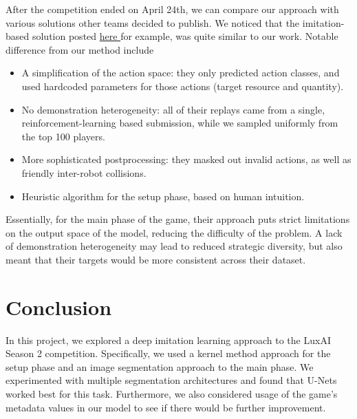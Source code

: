 \documentclass[10pt,twocolumn,letterpaper]{article}
\begin{document}
After the competition ended on April 24th, we can compare our
approach with various solutions other teams decided to publish.
We noticed that the imitation-based solution posted
\href{https://www.kaggle.com/competitions/lux-ai-season-2/discussion/404842}{%
  here%
} for example, was quite similar to our work.
Notable difference from our method include
\begin{itemize}
    \item A simplification of the action space: they only
      predicted action classes, and used hardcoded parameters
      for those actions (target resource and quantity).
    \item No demonstration heterogeneity: all of their replays
      came from a single, reinforcement-learning based submission,
      while we sampled uniformly from the top 100 players.
    \item More sophisticated postprocessing: they masked out
      invalid actions, as well as friendly inter-robot collisions.
    \item Heuristic algorithm for the setup phase, based on human intuition.
\end{itemize}
Essentially, for the main phase of the game, their
approach puts strict limitations on the output space
of the model, reducing the difficulty of the problem.
A lack of demonstration heterogeneity may lead to
reduced strategic diversity, but also meant that their
targets would be more consistent across their dataset.

\section{Conclusion}

In this project, we explored a deep imitation
learning approach to the LuxAI Season 2 competition.
Specifically, we used a kernel method approach for the setup
phase and an image segmentation approach to the main phase.
We experimented with multiple segmentation architectures
and found that U-Nets worked best for this task.
Furthermore, we also considered usage of the game's metadata
values in our model to see if there would be further improvement.


\clearpage

{
  \small
  
  
}
\end{document}
